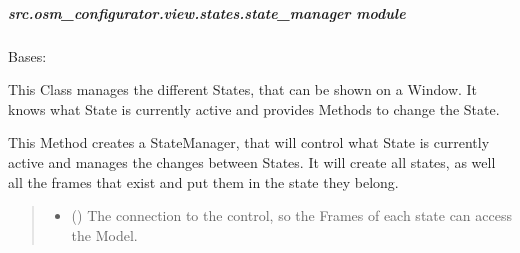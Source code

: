 \documentclass[letterpaper,10pt,english]{sphinxmanual}
\begin{document}
\subparagraph{src.osm\_configurator.view.states.state\_manager module}
\label{\detokenize{apidoc/src.osm_configurator.view.states:module-src.osm_configurator.view.states.state_manager}}\label{\detokenize{apidoc/src.osm_configurator.view.states:src-osm-configurator-view-states-state-manager-module}}

\begin{fulllineitems}
\label{\detokenize{apidoc/src.osm_configurator.view.states:src.osm_configurator.view.states.state_manager.StateManager}}
\pysigstartsignatures
{}
\pysigstopsignatures
\sphinxAtStartPar
Bases: 

\sphinxAtStartPar
This Class manages the different States, that can be shown on a Window.
It knows what State is currently active and provides Methods to change the State.

\begin{fulllineitems}
\label{\detokenize{apidoc/src.osm_configurator.view.states:src.osm_configurator.view.states.state_manager.StateManager.__init__}}
\pysigstartsignatures
{}
\pysigstopsignatures
\sphinxAtStartPar
This Method creates a StateManager, that will control what State is currently active and manages
the changes between States.
It will create all states, as well all the frames that exist and put them in the state they belong.
\begin{quote}\begin{description}
\begin{itemize}
\item {} 
\sphinxAtStartPar
{} ({\hyperref[\detokenize{apidoc/src.osm_configurator.control:src.osm_configurator.control.control_interface.IControl}]{}}) \textendash{} The connection to the control, so the Frames of each state can access the Model.


\end{itemize}
\end{description}
\end{quote}
\end{fulllineitems}
\end{fulllineitems}
\end{document}
